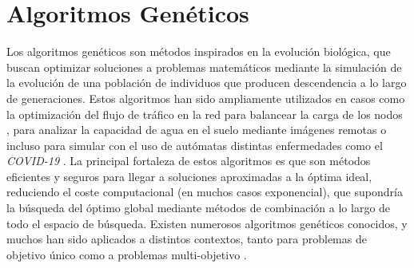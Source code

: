 






\section{Algoritmos Genéticos}


Los algoritmos genéticos son métodos inspirados en la evolución biológica, que buscan optimizar soluciones a problemas matemáticos mediante la simulación de la evolución de una población de individuos que producen descendencia a lo largo de generaciones. Estos algoritmos han sido ampliamente utilizados en casos como la optimización del flujo de tráfico en la red para balancear la carga de los nodos \cite{5483775}, para analizar la capacidad de agua en el suelo mediante imágenes remotas \cite{PACHEPSKY1998213} o incluso para simular con el uso de autómatas distintas enfermedades como el \textit{COVID-19} \cite{GHOSH2020106692}. La principal fortaleza de estos algoritmos es que son métodos eficientes y seguros para llegar a soluciones aproximadas a la óptima ideal, reduciendo el coste computacional (en muchos casos exponencial), que supondría la búsqueda del óptimo global mediante métodos de combinación a lo largo de todo el espacio de búsqueda. Existen numerosos algoritmos genéticos conocidos, y muchos han sido aplicados a distintos contextos, tanto para problemas de objetivo único como a problemas multi-objetivo \cite{wang2020comparative}.

